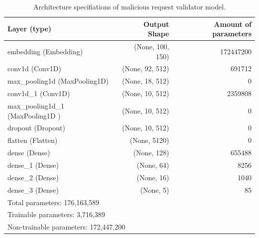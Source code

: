 \begin{table}[!h]
	\begin{tabular}{lrr}
	\hline
	\textbf{Layer (type)}             & \textbf{Output Shape} & \textbf{Amount of parameters} \\ \hline
	embedding (Embedding)             & (None, 100, 150)      & 172447200                     \\
	conv1d (Conv1D)                   & (None, 92, 512)       & 691712                        \\
	max\_pooling1d (MaxPooling1D)     & (None, 18, 512)       & 0                             \\
	conv1d\_1 (Conv1D)                & (None, 10, 512)       & 2359808                       \\
	max\_pooling1d\_1 (MaxPooling1D ) & (None, 10, 512)       & 0                             \\
	dropout (Dropout)                 & (None, 10, 512)       & 0                             \\
	flatten (Flatten)                 & (None, 5120)          & 0                             \\
	dense (Dense)                     & (None, 128)           & 655488                        \\
	dense\_1 (Dense)                  & (None, 64)            & 8256						 \\
	dense\_2 (Dense)                  & (None, 16)            & 1040                         \\ 
	dense\_3 (Dense)                  & (None, 5)             & 85                           
	\\ \hline
	\multicolumn{3}{l}{Total parameters: 176,163,589}                                         \\
	\multicolumn{3}{l}{Trainable parameters: 3,716,389}                                       \\
	\multicolumn{3}{l}{Non-trainable parameters: 172,447,200}                                 \\ \hline
	\end{tabular}
	\caption{\label{demo-table} Architecture specifiations of malicious request validator model.}
\end{table}


